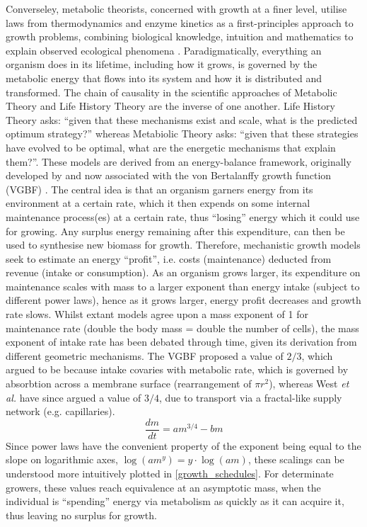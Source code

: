 \documentclass[a4paper]{article} %
\begin{document}
    Converseley, metabolic theorists, concerned with growth at a finer level, utilise laws from thermodynamics and enzyme kinetics as a first-principles approach to growth problems, combining biological knowledge, intuition and mathematics to explain observed ecological phenomena \autocite{Brown2004}. Paradigmatically, everything an organism does in its lifetime, including how it grows, is governed by the metabolic energy that flows into its system and how it is distributed and transformed. The chain of causality in the scientific approaches of Metabolic Theory and Life History Theory are the inverse of one another. Life History Theory asks: ``given that these mechanisms exist and scale, what is the predicted optimum strategy?'' whereas Metabiolic Theory asks: ``given that these strategies have evolved to be optimal, what are the energetic mechanisms that explain them?''. These models are derived from an energy-balance framework, originally developed by \cite{Putter1920} and now associated with the von Bertalanffy growth function (VGBF) \autocite{vonBert1938, VonBertalanffy1957}. The central idea is that an organism garners energy from its environment at a certain rate, which it then expends on some internal maintenance process(es) at a certain rate, thus ``losing'' energy which it could use for growing. Any surplus energy remaining after this expenditure, can then be used to synthesise new biomass for growth.  Therefore, mechanistic growth models seek to estimate an energy ``profit'', i.e. costs (maintenance) deducted from revenue (intake or consumption). As an organism grows larger, its expenditure on maintenance scales with mass to a larger exponent than energy intake (subject to different power laws), hence as it grows larger, energy profit decreases and growth rate slows. Whilst extant models agree upon a mass exponent of 1 for maintenance rate (double the body mass = double the number of cells), the mass exponent of intake rate has been debated through time, given its derivation from different geometric mechanisms. The VGBF proposed a value of $2/3$, which \cite{vonBert1938} argued to be because intake covaries with metabolic rate, which is governed by absorbtion across a membrane surface (rearrangement of $\pi r^2$), whereas West \textit{et al.} have since argued a value of $3/4$, due to transport via a fractal-like supply network (e.g. capillaries). 
    \begin{equation}
        \frac{dm}{dt} = am^{3/4} - bm \label{west_ogm}
    \end{equation}
    Since power laws have the convenient property of the exponent being equal to the slope on logarithmic axes, $\log{(am^y)} = y\cdot \log{(am)}$, these scalings can be understood more intuitively plotted in \cref{growth_schedules}. For determinate growers, these values reach equivalence at an asymptotic mass, when the individual is ``spending'' energy via metabolism as quickly as it can acquire it, thus leaving no surplus for growth.
\end{document}

